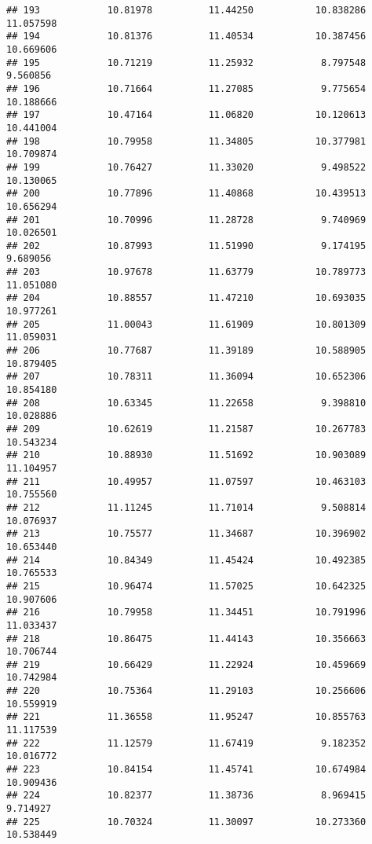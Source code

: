 \documentclass[
]{article}
\begin{document}
\begin{verbatim}
## 193            10.81978          11.44250           10.838286         11.057598
## 194            10.81376          11.40534           10.387456         10.669606
## 195            10.71219          11.25932            8.797548          9.560856
## 196            10.71664          11.27085            9.775654         10.188666
## 197            10.47164          11.06820           10.120613         10.441004
## 198            10.79958          11.34805           10.377981         10.709874
## 199            10.76427          11.33020            9.498522         10.130065
## 200            10.77896          11.40868           10.439513         10.656294
## 201            10.70996          11.28728            9.740969         10.026501
## 202            10.87993          11.51990            9.174195          9.689056
## 203            10.97678          11.63779           10.789773         11.051080
## 204            10.88557          11.47210           10.693035         10.977261
## 205            11.00043          11.61909           10.801309         11.059031
## 206            10.77687          11.39189           10.588905         10.879405
## 207            10.78311          11.36094           10.652306         10.854180
## 208            10.63345          11.22658            9.398810         10.028886
## 209            10.62619          11.21587           10.267783         10.543234
## 210            10.88930          11.51692           10.903089         11.104957
## 211            10.49957          11.07597           10.463103         10.755560
## 212            11.11245          11.71014            9.508814         10.076937
## 213            10.75577          11.34687           10.396902         10.653440
## 214            10.84349          11.45424           10.492385         10.765533
## 215            10.96474          11.57025           10.642325         10.907606
## 216            10.79958          11.34451           10.791996         11.033437
## 218            10.86475          11.44143           10.356663         10.706744
## 219            10.66429          11.22924           10.459669         10.742984
## 220            10.75364          11.29103           10.256606         10.559919
## 221            11.36558          11.95247           10.855763         11.117539
## 222            11.12579          11.67419            9.182352         10.016772
## 223            10.84154          11.45741           10.674984         10.909436
## 224            10.82377          11.38736            8.969415          9.714927
## 225            10.70324          11.30097           10.273360         10.538449

\end{verbatim}
\end{document}

